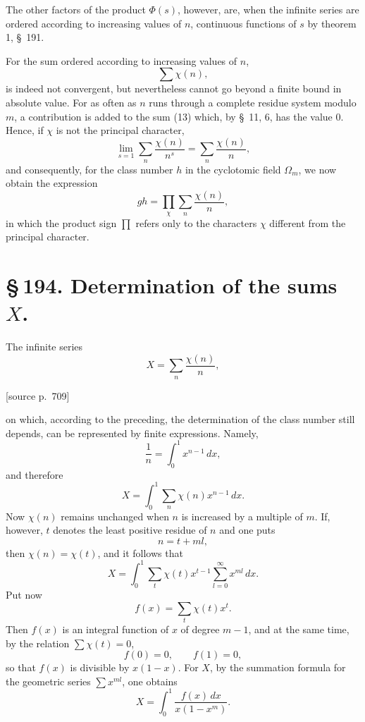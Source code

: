 \documentclass[11pt]{article}
\newcommand{\srcpage}[1]{\par\medskip\noindent\textsf{[source p.~#1]}\par\smallskip}
\begin{document}
The other factors of the product $\Phi(s)$, however, are, when the infinite series are ordered according to increasing values of $n$, continuous functions of $s$ by theorem 1, \S~191.

For the sum ordered according to increasing values of $n$,
\begin{equation}
\sum\chi(n),
\tag{13}
\end{equation}
is indeed not convergent, but nevertheless cannot go beyond a finite bound in absolute value. For as often as $n$ runs through a complete residue system modulo $m$, a contribution is added to the sum (13) which, by \S~11, 6, has the value $0$. Hence, if $\chi$ is not the principal character,
\begin{equation}
\lim_{s=1}\sum_n\frac{\chi(n)}{n^s}=\sum_n\frac{\chi(n)}{n},
\tag{14}
\end{equation}
and consequently, for the class number $h$ in the cyclotomic field $\Omega_m$, we now obtain the expression
\begin{equation}
gh=\prod_\chi\sum_n\frac{\chi(n)}{n},
\tag{15}
\end{equation}
in which the product sign $\prod$ refers only to the characters $\chi$ different from the principal character.

\section*{\S\,194. Determination of the sums $X$.}

The infinite series
\begin{equation}
X=\sum_n\frac{\chi(n)}{n},
\tag{1}
\end{equation}

\srcpage{709}
on which, according to the preceding, the determination of the class number still depends, can be represented by finite expressions. Namely,
\[
\frac1n=\int_0^1x^{n-1}\,dx,
\]
and therefore
\[
X=\int_0^1\sum_n\chi(n)x^{n-1}\,dx.
\]
Now $\chi(n)$ remains unchanged when $n$ is increased by a multiple of $m$. If, however, $t$ denotes the least positive residue of $n$ and one puts
\[
n=t+ml,
\]
then $\chi(n)=\chi(t)$, and it follows that
\[
X=\int_0^1\sum_t\chi(t)x^{t-1}\sum_{l=0}^{\infty}x^{ml}\,dx.
\]
Put now
\begin{equation}
f(x)=\sum_t\chi(t)x^t.
\tag{2}
\end{equation}
Then $f(x)$ is an integral function of $x$ of degree $m-1$, and at the same time, by the relation $\sum\chi(t)=0$,
\begin{equation}
f(0)=0,\qquad f(1)=0,
\tag{3}
\end{equation}
so that $f(x)$ is divisible by $x(1-x)$. For $X$, by the summation formula for the geometric series $\sum x^{ml}$, one obtains
\begin{equation}
X=\int_0^1\frac{f(x)\,dx}{x(1-x^m)}.
\tag{4}
\end{equation}
\end{document}
